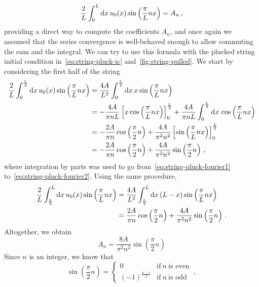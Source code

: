 \begin{equation}
  \frac{2}{L}\int_{0}^{L}\mathrm{d} x\, u_0(x)\sin\left(\frac{\pi}{L}nx\right)=A_n\,,
\end{equation}
providing a direct way to compute the coefficients $A_n$, and once again we assumed that the series convergence is well-behaved enough to allow commuting the sum and the integral. We can try to use this formula with the plucked string initial condition in~\cref{eq:string-pluck-ic} and~\cref{fig:string-pulled}. We start by considering the first half of the string
\begin{align}
  \frac{2}{L}\int_{0}^{\frac{L}{2}}\mathrm{d} x\, u_0(x)\sin\left(\frac{\pi}{L}nx\right)&
  =\frac{4A}{L^2}\int_{0}^{\frac{L}{2}}\mathrm{d} x\, x\sin\left(\frac{\pi}{L}nx\right)\\
  \label{eq:string-pluck-fourier1}
  &=-\frac{4A}{\pi n L}\left[x\cos\left(\frac{\pi}{L}nx\right)\right]_0^{\frac{L}{2}}
  +\frac{4A}{\pi n L}\int_{0}^{\frac{L}{2}}\mathrm{d} x\,\cos\left(\frac{\pi}{L}nx\right)\\
  \label{eq:string-pluck-fourier2}
  &=-\frac{2A}{\pi n}\cos\left(\frac{\pi}{2}n\right)+\frac{4A}{\pi^2 n^2}\left[\sin\left(\frac{\pi}{L}nx\right)\right]_0^{\frac{L}{2}}\\
  &=-\frac{2A}{\pi n}\cos\left(\frac{\pi}{2}n\right)+\frac{4A}{\pi^2 n^2}\sin\left(\frac{\pi}{2}n\right)\,,
\end{align}
where integration by parts was used to go from~\cref{eq:string-pluck-fourier1} to~\cref{eq:string-pluck-fourier2}.
Using the same procedure,
\begin{align}
  \frac{2}{L}\int_{\frac{L}{2}}^{L}\mathrm{d} x\, u_0(x)\sin\left(\frac{\pi}{L}nx\right)
  &=\frac{4A}{L^2}\int_{\frac{L}{2}}^{L}\mathrm{d} x\, (L-x)\sin\left(\frac{\pi}{L}nx\right)\\
  &=\frac{2A}{\pi n}\cos\left(\frac{\pi}{2}n\right)+\frac{4A}{\pi^2 n^2}\sin\left(\frac{\pi}{2}n\right)\,.
\end{align}
Altogether, we obtain
\begin{equation}
  A_n=\frac{8A}{\pi^2 n^2}\sin\left(\frac{\pi}{2}n\right)
\end{equation}
Since $n$ is an integer, we know that
\begin{equation}
  \sin\left(\frac{\pi}{2}n\right)=
  \begin{cases}
    0&\text{if}~n~\text{is even}\\
    (-1)^{\frac{n-1}{2}}&\text{if}~n~\text{is odd}
  \end{cases}\,,\label{eq:sinpn2}
\end{equation}
